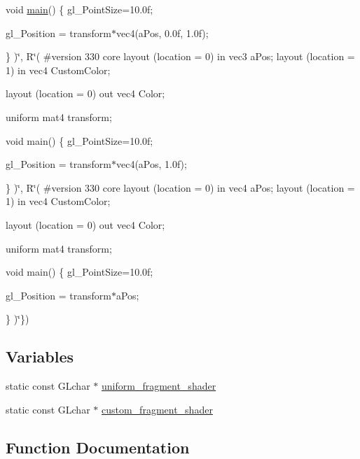 \begin{DoxyCompactItemize}
void \mbox{\hyperlink{gtest__tests_8cpp_a3c04138a5bfe5d72780bb7e82a18e627}{main}}()
\{
gl\+\_\+\+Point\+Size=10.\+0f;

gl\+\_\+\+Position = transform$\ast$vec4(a\+Pos, 0.\+0f, 1.\+0f);

\}
)\char`\"{}, R\char`\"{}(
\#version 330 core
layout (location = 0) in vec3 a\+Pos;
layout (location = 1) in vec4 Custom\+Color;

layout (location = 0) out vec4 Color;

uniform mat4 transform;

void main()
\{
gl\+\_\+\+Point\+Size=10.\+0f;

gl\+\_\+\+Position = transform$\ast$vec4(a\+Pos, 1.\+0f);

\}
)\char`\"{}, R\char`\"{}(
\#version 330 core
layout (location = 0) in vec4 a\+Pos;
layout (location = 1) in vec4 Custom\+Color;

layout (location = 0) out vec4 Color;

uniform mat4 transform;

void main()
\{
gl\+\_\+\+Point\+Size=10.\+0f;

gl\+\_\+\+Position = transform$\ast$a\+Pos;

\}
)\char`\"{}\})
\end{DoxyCompactItemize}
\subsection*{Variables}
\begin{DoxyCompactItemize}
\item 
static const G\+Lchar $\ast$ \mbox{\hyperlink{namespaceshaders_adb630ad693498e928fa4fec5657b7fbd}{uniform\+\_\+fragment\+\_\+shader}}
\item 
static const G\+Lchar $\ast$ \mbox{\hyperlink{namespaceshaders_a53aefc57e61e6526c0469b6790903754}{custom\+\_\+fragment\+\_\+shader}}
\end{DoxyCompactItemize}


\subsection{Function Documentation}
\mbox{\label{namespaceshaders_ad65f4b831f91212b1f8f7da07ada6898}} 
